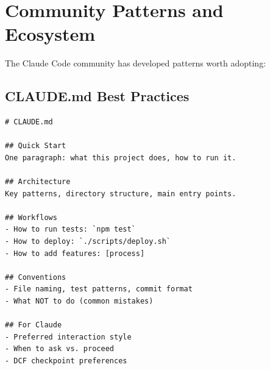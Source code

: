 \chapter{Community Patterns and Ecosystem}

The Claude Code community has developed patterns worth adopting:

\section{CLAUDE.md Best Practices}

\begin{lstlisting}
# CLAUDE.md

## Quick Start
One paragraph: what this project does, how to run it.

## Architecture
Key patterns, directory structure, main entry points.

## Workflows
- How to run tests: `npm test`
- How to deploy: `./scripts/deploy.sh`
- How to add features: [process]

## Conventions
- File naming, test patterns, commit format
- What NOT to do (common mistakes)

## For Claude
- Preferred interaction style
- When to ask vs. proceed
- DCF checkpoint preferences
\end{lstlisting}

